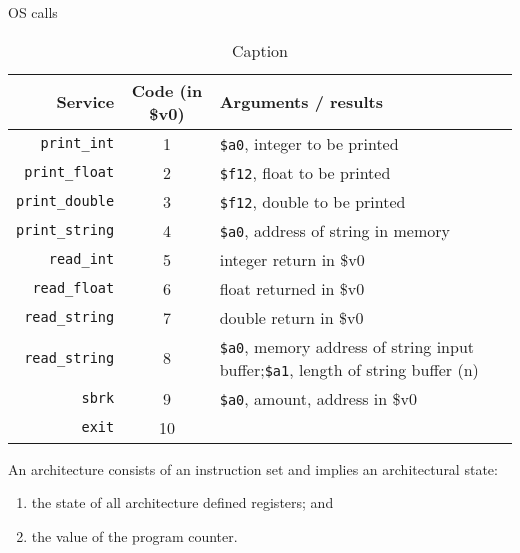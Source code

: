 OS calls

\begin{table}
    \centering
    \begin{tabular}{rcp{20em}}
        \toprule
        Service & Code (in \$v0) & Arguments / results \\
        \midrule
        \texttt{print\_int} & 1 & \texttt{\$a0}, integer to be printed \\
        \texttt{print\_float} & 2 & \texttt{\$f12}, float to be printed \\
        \texttt{print\_double} & 3 & \texttt{\$f12}, double to be printed \\
        \texttt{print\_string} & 4 & \texttt{\$a0}, address of string in memory \\
        \texttt{read\_int} & 5 & integer return in \$v0 \\
        \texttt{read\_float} & 6 & float returned in \$v0 \\
        \texttt{read\_string} & 7 & double return in \$v0 \\
        \texttt{read\_string} & 8 & \texttt{\$a0}, memory address of string input buffer;\newline\texttt{\$a1}, length of string buffer (n) \\
        \texttt{sbrk} & 9 & \texttt{\$a0}, amount, address in \$v0 \\
        \texttt{exit} & 10 \\
        \bottomrule
    \end{tabular}
    \caption{Caption}
    \label{tab:my_label}
\end{table}

\begin{definition}
    An architecture consists of an instruction set and implies an architectural state:
    \begin{enumerate}
        \item the state of all architecture defined registers; and
        \item the value of the program counter.
    \end{enumerate}
\end{definition}
